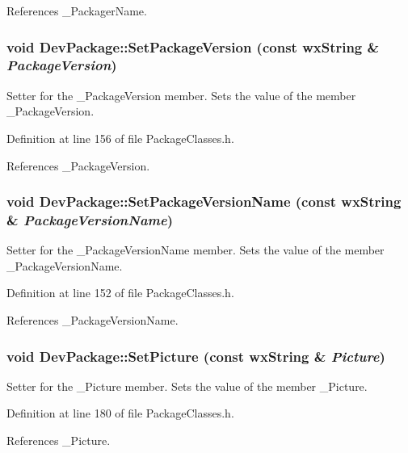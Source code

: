 References \_\-Packager\-Name.
\subsubsection{\setlength{\rightskip}{0pt plus 5cm}void Dev\-Package::Set\-Package\-Version (const wx\-String \& {\em Package\-Version})\hspace{0.3cm}{\tt  [inline]}}\label{class_dev_package_6028e964f2527482fa7c62f89be8219e}


Setter for the \_\-Package\-Version member. Sets the value of the member \_\-Package\-Version. 

Definition at line 156 of file Package\-Classes.h.

References \_\-Package\-Version.
\subsubsection{\setlength{\rightskip}{0pt plus 5cm}void Dev\-Package::Set\-Package\-Version\-Name (const wx\-String \& {\em Package\-Version\-Name})\hspace{0.3cm}{\tt  [inline]}}\label{class_dev_package_f12d4115ad6a61e0b4baa219954f1472}


Setter for the \_\-Package\-Version\-Name member. Sets the value of the member \_\-Package\-Version\-Name. 

Definition at line 152 of file Package\-Classes.h.

References \_\-Package\-Version\-Name.
\subsubsection{\setlength{\rightskip}{0pt plus 5cm}void Dev\-Package::Set\-Picture (const wx\-String \& {\em Picture})\hspace{0.3cm}{\tt  [inline]}}\label{class_dev_package_2a506236d50258a60bd476c5199ad2bd}


Setter for the \_\-Picture member. Sets the value of the member \_\-Picture. 

Definition at line 180 of file Package\-Classes.h.

References \_\-Picture.
